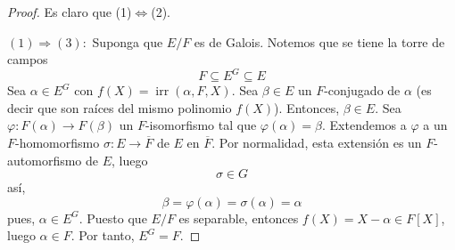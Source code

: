 \documentclass[12pt]{report}
\theoremstyle{largebreak}
\newcommand\cf[3]{\ensuremath{#1:#2\rightarrow#3}}
\DeclareMathOperator{\irr}{irr}
\begin{document}
    \begin{proof}
        Es claro que (1)$\iff$(2).

        $(1)\Rightarrow(3):$ Suponga que $E/F$ es de Galois. Notemos que se tiene la torre de campos
        \begin{equation*}
            F\subseteq E^G\subseteq E
        \end{equation*}
        Sea $\alpha\in E^G$ con $f(X)=\irr(\alpha, F,X)$. Sea $\beta\in E$ un $F$-conjugado de $\alpha$ (es decir que son raíces del mismo polinomio $f(X)$). Entonces, $\beta\in E$. Sea $\cf{\varphi}{F(\alpha)}{F(\beta)}$ un $F$-isomorfismo tal que $\varphi(\alpha)=\beta$. Extendemos a $\varphi$ a un $F$-homomorfismo $\cf{\sigma}{E}{\overline{F}}$ de $E$ en $\overline{F}$. Por normalidad, esta extensión es un $F$-automorfismo de $E$, luego
        \begin{equation*}
            \sigma\in G
        \end{equation*}
        así,
        \begin{equation*}
            \beta=\varphi(\alpha)=\sigma(\alpha)=\alpha
        \end{equation*}
        pues, $\alpha\in E^G$. Puesto que $E/F$ es separable, entonces $f(X)=X-\alpha\in F[X]$, luego $\alpha\in F$. Por tanto, $E^G=F$.


\end{proof}
\end{document}
